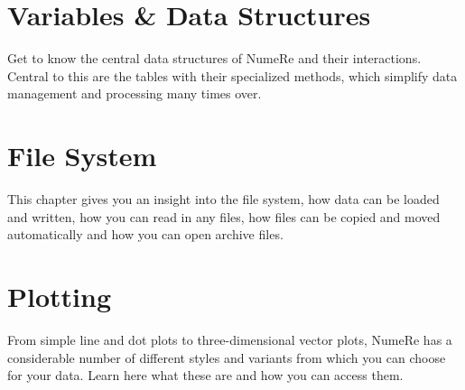 \documentclass[DIV=17, parskip=half]{scrreprt}
\begin{document}
	\chapter{Variables \& Data Structures}
		Get to know the central data structures of NumeRe and their interactions. Central to this are the tables with their specialized methods, which simplify data management and processing many times over.
		
		
		
		
		
		
		
		
	
	\chapter{File System}
		This chapter gives you an insight into the file system, how data can be loaded and written, how you can read in any files, how files can be copied and moved automatically and how you can open archive files.
		
		
		
		
		
		
		
	
	\chapter{Plotting}
		From simple line and dot plots to three-dimensional vector plots, NumeRe has a considerable number of different styles and variants from which you can choose for your data. Learn here what these are and how you can access them.
		
		
		
		
		
		
		
		
		
		
		
		
		
		
		
		
		
	
\end{document}
